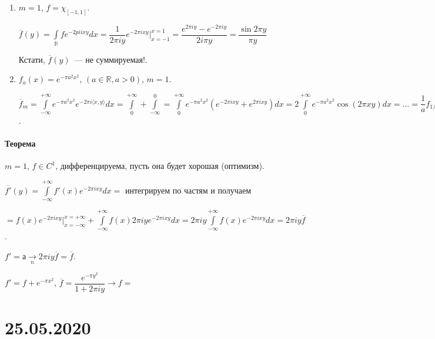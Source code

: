 \documentclass{article}
\begin{document}
        \begin{enumerate}
        
            \item $m = 1$, $f = \chi_{[-1, 1]}$.
            
                $\overline{f}(y) = \int\limits_{\mathbb{R}} f e^{-2 pi i xy} dx = \dfrac{1}{2 \pi i y} e^{-2 \pi i x y} \bigg|^{x = 1}_{x = -1} = \dfrac{e^{2 \pi i y} - e^{-2 \pi i y}}{2 i \pi y} = \dfrac{\sin {2 \pi y}}{\pi y}$
                
                Кстати, $\overline{f}(y)$~--- не суммируемая!.
                
            \item $f_a(x) = e^{-\pi a^2 x^2}$, $(a \in \mathbb{R}, a > 0)$, $m = 1$.
            
            $\overline{f}_m = \int\limits^{+\infty}_{-\infty} e^{-\pi a^2 x^2} e^{-2 \pi i \langle x, y \rangle} dx = \int\limits^{+\infty}_0 + \int\limits^0_{-\infty} = \int\limits_0^{+\infty} e^{-\pi a^2 x^2} (e^{-2 \pi i x y} + e^{2 \pi i x y}) dx = 2 \int\limits^{+\infty}_0 e^{-\pi a^2 x^2} \cos (2 \pi x y) dx = \ldots = \dfrac{1}{a} f_{1/a}(y)$.
            
        \end{enumerate}
        
    \subsection{Теорема}
        
        $m = 1$, $f \in C^1$, дифференцируема, пусть она будет хорошая (оптимизм).
        
        $\overline{f'}(y) = \int\limits^{+\infty}_{-\infty} f'(x) e^{-2 \pi i xy} dx =$ интегрируем по частям и получаем
        
        $= f(x) e^{-2 \pi i xy} \bigg|^{x = +\infty}_{x = -\infty} + \int\limits^{+\infty}_{-\infty} f(x) 2 \pi i y e^{-2 \pi i x y} dx = 2 \pi i y \int\limits^{+\infty}_{-\infty} f(x) e^{-2 \pi i x y} dx = 2 \pi i y \overline{f}$.
        
        $f' = а \xrightarrow[n]{} 2 \pi i y \overline{f} = \overline{f}$.
        
        $f' = f + e^{-\pi x^2}$, $\overline{f} = \dfrac{e^{-\pi y^2}}{1 + 2 \pi i y} \rightarrow f = $
        
\newpage

\part{25.05.2020}
    
\end{document}
